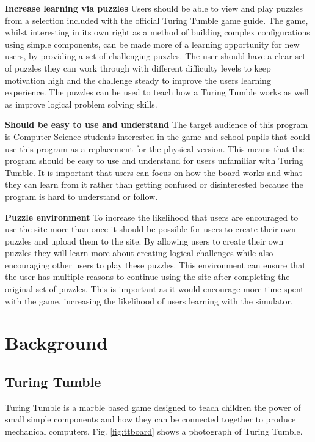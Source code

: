 \documentclass{l4proj}
\begin{document}
\textbf{Increase learning via puzzles} Users should be able to view and play puzzles from a selection included with the official Turing Tumble game guide. The game, whilst interesting in its own right as a method of building complex configurations using simple components, can be made more of a learning opportunity for new users, by providing a set of challenging puzzles. The user should have a clear set of puzzles they can work through with different difficulty levels to keep motivation high and the challenge steady to improve the users learning experience. The puzzles can be used to teach how a Turing Tumble works as well as improve logical problem solving skills.    

\textbf{Should be easy to use and understand} The target audience of this program is Computer Science students interested in the game and school pupils that could use this program as a replacement for the physical version. This means that the program should be easy to use and understand for users unfamiliar with Turing Tumble. It is important that users can focus on how the board works and what they can learn from it rather than getting confused or disinterested because the program is hard to understand or follow. 

\textbf{Puzzle environment} To increase the likelihood that users are encouraged to use the site more than once it should be possible for users to create their own puzzles and upload them to the site. By allowing users to create their own puzzles they will learn more about creating logical challenges while also encouraging other users to play these puzzles. This environment can ensure that the user has multiple reasons to continue using the site after completing the original set of puzzles. This is important as it would encourage more time spent with the game, increasing the likelihood of users learning with the simulator. 

\chapter{Background}
\section{Turing Tumble}
\label{section:background}
Turing Tumble is a marble based game designed to teach children the power of small simple components and how they can be connected together to produce mechanical computers. Fig. \ref{fig:ttboard} shows a photograph of Turing Tumble.
\end{document}

